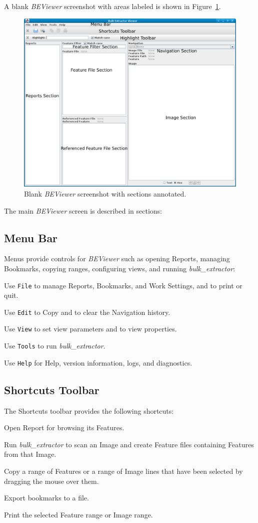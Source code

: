 \documentclass[10pt,twoside]{article}
\newcommand{\bulk}{\emph{bulk\_extractor}\xspace}
\newcommand{\bev}{\emph{BEViewer}\xspace}
\begin{document}
A blank \bev screenshot with areas labeled is shown in Figure~\ref{bev-blank-annotated}.
\begin{figure}[h]
\center
\includegraphics[scale=0.25]{images/BEViewer_blank_annotated}
\caption{Blank \bev screenshot with sections annotated.\label{bev-blank-annotated}}
\end{figure}

The main \bev screen is described in sections:
\subsection{Menu Bar}
Menus provide controls for \bev such as opening Reports, managing Bookmarks,
copying ranges, configuring views, and running \bulk:
\begin{compactitem}
\item Use \texttt{File} to manage Reports, Bookmarks, and Work Settings, and to print or quit.
\item Use \texttt{Edit} to Copy and to clear the Navigation history.
\item Use \texttt{View} to set view parameters and to view properties.
\item Use \texttt{Tools} to run \bulk.
\item Use \texttt{Help} for Help, version information, logs, and diagnostics.
\end{compactitem}
\subsection{Shortcuts Toolbar}
The Shortcuts toolbar provides the following shortcuts:
\begin{compactitem}
\item Open Report for browsing its Features.
\item Run \bulk to scan an Image and create Feature files containing Features from that Image.
\item Copy a range of Features or a range of Image lines
that have been selected by dragging the mouse over them.
\item Export bookmarks to a file.
\item Print the selected Feature range or Image range.
\end{compactitem}
\end{document}
